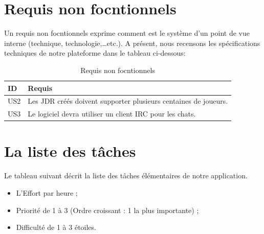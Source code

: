 \section{Requis non focntionnels}
Un requis non focntionnels exprime comment est le
système d’un point de vue interne (technique,
technologie,…etc.). A présent, nous recensons les spécifications techniques de notre plateforme dans le tableau ci-dessous:
    \begin{table}[H]
	\centering
	
	\label{specifnonFonct}
	\begin{tabular}{|l | p{14.5cm}| }
		\hline	ID & Requis      \\\hline           
		US2	&Les JDR créés doivent supporter plusieurs centaines de joueurs. \\ \hline
		US3	&Le logiciel devra utiliser un client IRC pour les chats. \\ \hline
		
	\end{tabular}
		\caption{Requis non focntionnels}
\end{table}

\section{La liste des tâches}
Le tableau suivant décrit la liste des tâches élémentaires de notre application.
\begin{itemize}
	\item L'Effort par heure ; 
	\item Priorité de 1 à 3 (Ordre croissant : 1 la plus importante) ;  
	\item Difficulté de 1 à 3 étoiles.
\end{itemize}


